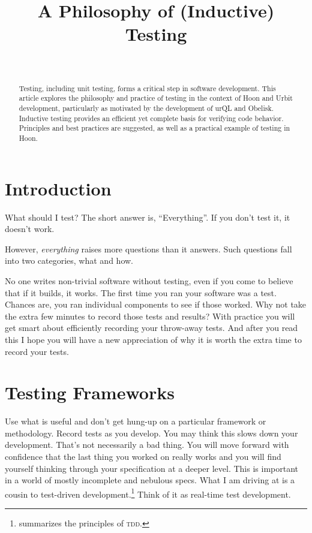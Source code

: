 \documentclass[twoside]{article}
\title{A Philosophy of (Inductive) Testing}
\author{\authorname~\authorpatp \\ \affiliation}
\date{}
\begin{document}
\maketitle
\thispagestyle{firststyle}

\begin{abstract}
Testing, including unit testing, forms a critical step in software development.  This article explores the philosophy and practice of testing in the context of Hoon and Urbit development, particularly as motivated by the development of urQL and Obelisk.  Inductive testing provides an efficient yet complete basis for verifying code behavior.  Principles and best practices are suggested, as well as a practical example of testing in Hoon.
\end{abstract}

\setcounter{page}{1}

\tableofcontents

\section{Introduction}

What should I test?  The short answer is, “Everything”.  If you don't test it, it doesn't work.

However, \emph{everything} raises more questions than it answers. Such questions fall into two categories, what and how.

No one writes non-trivial software without testing, even if you come to believe that if it builds, it works. The first time you ran your software was a test. Chances are, you ran individual components to see if those worked. Why not take the extra few minutes to record those tests and results? With practice you will get smart about efficiently recording your throw-away tests. And after you read this I hope you will have a new appreciation of why it is worth the extra time to record your tests.

\section{Testing Frameworks}

Use what is useful and don't get hung-up on a particular framework or methodology. Record tests as you develop. You may think this slows down your development. That's not necessarily a bad thing. You will move forward with confidence that the last thing you worked on really works and you will find yourself thinking through your specification at a deeper level. This is important in a world of mostly incomplete and nebulous specs. What I am driving at is a cousin to test-driven development.\footnote{\citet{Beck2023} summarizes the principles of \textsc{tdd}.} Think of it as real-time test development.
\end{document}
